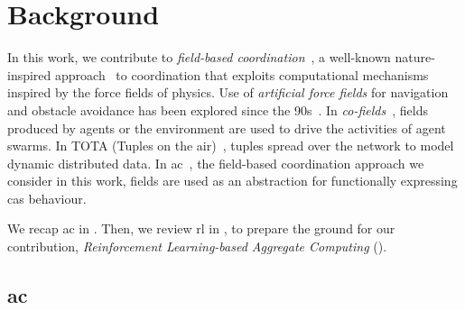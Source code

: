 \section{Background}\label{s:background}

In this work, we contribute to \emph{field-based coordination}~\cite{DBLP:conf/chi/XiaoH98,DBLP:journals/pervasive/MameiZL04,DBLP:conf/kes/TrzecL07,DBLP:journals/tosem/MameiZ09,DBLP:journals/jlap/ViroliBDACP19}, a well-known nature-inspired approach~\cite{DBLP:conf/idc/Omicini12} to coordination that exploits computational mechanisms inspired by the force fields of physics. %
%
Use of \emph{artificial force fields} for navigation and obstacle avoidance has been explored since the 90s~\cite{DBLP:conf/chi/XiaoH98}.
%
In \emph{co-fields}~\cite{DBLP:journals/pervasive/MameiZL04},
 fields produced by agents or the environment
 are used to %
 drive the activities of agent swarms.
%
In TOTA (Tuples on the air)~\cite{DBLP:journals/tosem/MameiZ09}, 
 tuples spread over the network
 to model dynamic distributed data. 
%
In \acl{ac}~\cite{DBLP:journals/computer/BealPV15,DBLP:journals/jlap/ViroliBDACP19}, 
 the field-based coordination approach we consider in this work,
 fields are used as an abstraction
 for functionally expressing \ac{cas} behaviour.
%

We recap \acl{ac} in .
Then, we review \ac{rl} in ,
 to prepare the ground for our contribution, \emph{Reinforcement Learning-based Aggregate Computing} ().

\subsection{\acl{ac}}\label{s:background:ac}

